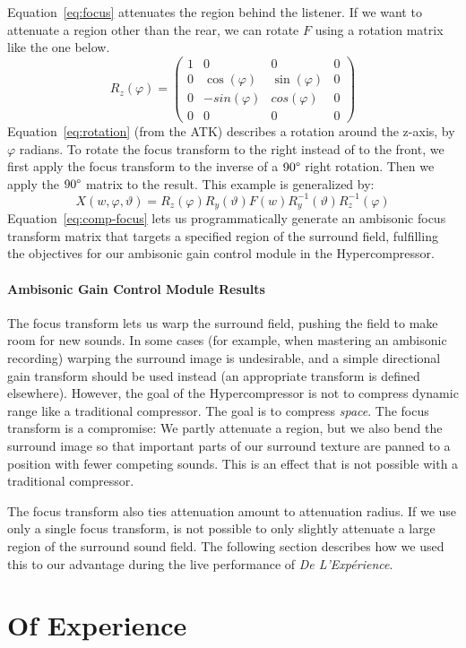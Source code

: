 Equation~\ref{eq:focus} attenuates the region behind the listener. 
If we want to attenuate a region other than the rear, we can rotate
$F$ using a rotation matrix like the one below.
\begin{equation}
R_z(\varphi)=\left( \begin{array}{cccc}
1 & 0 & 0 & 0 \\
0 & \cos(\varphi) & \sin(\varphi) & 0 \\
0 & -sin(\varphi) & cos(\varphi) & 0 \\
0 & 0 & 0 & 0
\end{array} \right)
\label{eq:rotation}
\end{equation}
Equation~\ref{eq:rotation} (from the ATK) describes a rotation around
the z-axis, by $\varphi$ radians. To rotate the focus transform to the
right instead of to the front, we first apply the focus transform to
the inverse of a $90\degree$ right rotation. Then we apply the
$90\degree$ matrix to the result. This example is generalized by:
\begin{equation}
X(w,\varphi,\vartheta)=R_z(\varphi)R_y(\vartheta)F(w) R_y^{-1}(\vartheta)R_z^{-1}(\varphi)
\label{eq:comp-focus}
\end{equation}
Equation~\ref{eq:comp-focus} lets us programmatically generate an
ambisonic focus transform matrix that targets a specified region of
the surround field, fulfilling the objectives for our ambisonic gain
control module in the Hypercompressor.

\paragraph{Ambisonic Gain Control Module Results}
The focus transform lets us warp the surround field, pushing the
field to make room for new sounds. In some cases (for example, when
mastering an ambisonic recording) warping the surround image is
undesirable, and a simple directional gain transform should be used
instead (an appropriate transform is defined
elsewhere\cite{Kronlachner2014i}). However, the goal of the
Hypercompressor is not to compress dynamic range like a traditional
compressor. The goal is to compress \emph{space}. The focus transform
is a compromise: We partly attenuate a region, but we also bend the
surround image so that important parts of our surround texture are
panned to a position with fewer competing sounds. This is an effect
that is not possible with a traditional compressor.

The focus transform also ties attenuation amount to attenuation
radius. If we use only a single focus transform, is not possible to only
slightly attenuate a large region of the surround sound field. The
following section describes how we used this to our advantage
during the live performance of \textit{De L'Exp\'{e}rience}.

\section{Of Experience}
\label{sec:experience}



